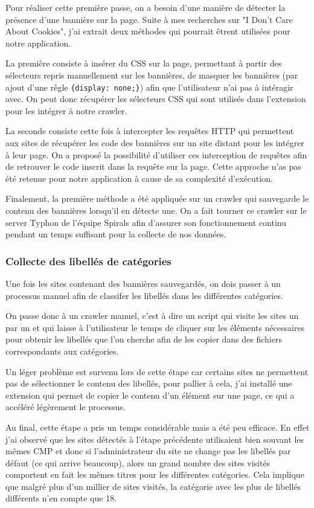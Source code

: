\documentclass[oneside,a4paper,12pt]{article}
\begin{document}
	Pour réaliser cette première passe, on a besoin d'une manière de détecter la présence d'une bannière sur la page. 
	Suite à mes recherches sur "I Don't Care About Cookies", j'ai extrait deux méthodes qui pourrait êtrent utilisées pour notre application.
	
	La première consiste à insérer du CSS sur la page, permettant à partir des sélecteurs repris manuellement sur les bannières, de masquer les bannières (par ajout d'une rêgle \lstinline|{display: none;}|) afin que l'utilisateur n'ai pas à intéragir avec.
	On peut donc récupérer les sélecteurs CSS qui sont utilisés dans l'extension pour les intégrer à notre crawler.
	
	La seconde consiste cette fois à intercepter les requêtes HTTP qui permettent aux sites de récupérer les code des bannières sur un site distant pour les intégrer à leur page.
	On a proposé la possibilité d'utiliser ces interception de requêtes afin de retrouver le code inscrit dans la requête sur la page. Cette approche n'as pas été retenue pour notre application à cause de sa complexité d'exécution.
	
	Finalement, la première méthode a été appliquée sur un crawler qui sauvegarde le contenu des bannières lorsqu'il en détecte une. On a fait tourner ce crawler sur le server Typhon de l'équipe Spirals afin d'assurer son fonctionnement continu pendant un temps suffisant pour la collecte de nos données.
	 
	\subsubsection{Collecte des libellés de catégories}
	Une fois les sites contenant des bannières sauvegardés, on dois passer à un processus manuel afin de classifer les libellés dans les différentes catégories.
	
	On passe donc à un crawler manuel, c'est à dire un script qui visite les sites un par un et qui laisse à l'utilisateur le temps de cliquer sur les éléments nécessaires pour obtenir les libellés que l'on cherche afin de les copier dans des fichiers correspondants aux catégories.
	
	Un léger problème est survenu lors de cette étape car certains sites ne permettent pas de sélectionner le contenu des libellés, pour pallier à cela, j'ai installé une extension qui permet de copier le contenu d'un élément sur une page, ce qui a accéléré légèrement le processus.
	
	Au final, cette étape a pris un temps considérable mais a été peu efficace. En effet j'ai observé que les sites détectés à l'étape précédente utilisaient bien souvant les mêmes CMP et donc si l'administrateur du site ne change pas les libellés par défaut (ce qui arrive beaucoup), alors un grand nombre des sites visités comportent en fait les mêmes titres pour les différentes catégories.
	Cela implique que malgré plus d'un millier de sites visités, la catégorie avec les plus de libellés différents n'en compte que 18.
	
\end{document}
